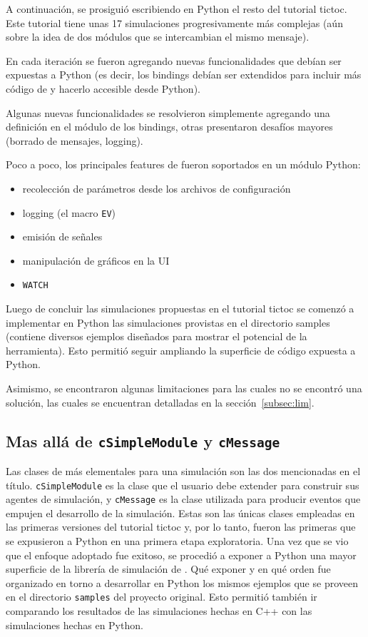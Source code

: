 A continuación, se prosiguió escribiendo en Python el resto del tutorial
tictoc. Este tutorial tiene unas 17 simulaciones progresivamente más complejas
(aún sobre la idea de dos módulos que se intercambian el mismo mensaje).

En cada iteración se fueron agregando nuevas funcionalidades que debían ser
expuestas a Python (es decir, los bindings debían ser extendidos para incluir
más código de \omnetpp{} y hacerlo accesible desde Python).

Algunas nuevas funcionalidades se resolvieron simplemente agregando una
definición en el módulo de los bindings, otras presentaron desafíos mayores
(borrado de mensajes, logging).

Poco a poco, los principales features de \omnetpp{} fueron soportados en un módulo
Python:

\begin{itemize}
    \item recolección de parámetros desde los archivos de configuración
    \item logging (el macro \verb!EV!)
    \item emisión de señales
    \item manipulación de gráficos en la UI
    \item \verb!WATCH!
\end{itemize}

Luego de concluir las simulaciones propuestas en el tutorial tictoc se comenzó
a implementar en Python las simulaciones provistas en el directorio samples
(contiene diversos ejemplos diseñados para mostrar el potencial de la
herramienta). Esto permitió seguir ampliando la superficie de código expuesta a
Python.

Asimismo, se encontraron algunas limitaciones para las cuales no se encontró
una solución, las cuales se encuentran detalladas en la
sección~\ref{subsec:lim}.

\subsection{Mas allá de \texttt{cSimpleModule} y \texttt{cMessage}}

Las clases de \omnetpp{} más elementales para una simulación son las dos
mencionadas en el título. \verb!cSimpleModule! es la clase que el usuario debe
extender para construir sus agentes de simulación, y \verb!cMessage! es la clase
utilizada para producir eventos que empujen el desarrollo de la simulación.
Estas son las únicas clases empleadas en las primeras versiones del tutorial
tictoc y, por lo tanto, fueron las primeras que se expusieron a Python en una
primera etapa exploratoria. Una vez que se vio que el enfoque adoptado fue
exitoso, se procedió a exponer a Python una mayor superficie de la librería de
simulación de \omnetpp{}. Qué exponer y en qué orden fue organizado en torno a
desarrollar en Python los mismos ejemplos que se proveen en el directorio
\verb!samples! del proyecto original. Esto permitió también ir comparando los
resultados de las simulaciones hechas en C++ con las simulaciones hechas en
Python.

